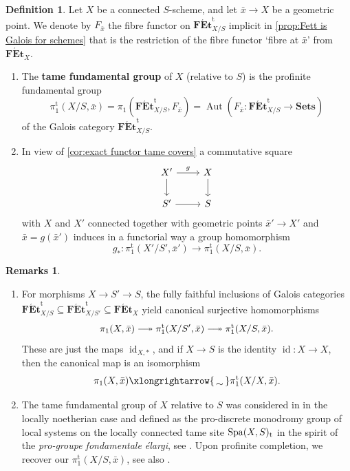 \documentclass[a4paper,twoside,11pt,reqno]{amsart}
\DeclareRobustCommand\longtwoheadrightarrow {\relbar\joinrel\twoheadrightarrow}
\newcommand{\surj}{\longtwoheadrightarrow}
\newcommand{\isomto}{\xlongrightarrow{\,\smash{\raisebox{-0.65ex} 
    {\ensuremath{\displaystyle\sim}}}\,}}
\newcommand{\la}{\longrightarrow}
\DeclareMathOperator{\id}{id}
\DeclareMathOperator{\Aut}{Aut}
\DeclareMathOperator{\Spa}{Spa}
\newcommand{\rt}{{\rm t}}  %
\newcommand{\cat}[1]{\mathbf{#1}}
\newcommand{\FEt}{\cat{F\acute{E}t}}
\newcommand{\Sets}{\cat{Sets}}
\newcommand{\pitame}{\pi_1^{\mathrm{t}}}
\newcommand{\FEtt}{{\cat{F\acute{E}t}}^{\!\mathrm{t}}}
\theoremstyle{definition}
\newtheorem{defi}[thm]{Definition}
\newtheorem{rmks}[thm]{Remarks}
\numberwithin{equation}{subsection}
\begin{document}
\begin{defi}
\label{defi:tamepi1 schemes}
    Let $X$ be a connected $S$-scheme, and let $\bar x \to X$ be a geometric point. We denote by $F_{\bar x}$ the fibre functor on $\FEtt_{X/S}$ implicit in \cref{prop:Fett is Galois for schemes} that is the restriction of the fibre functor `fibre at $\bar x$' from $\FEt_X$.     
    \begin{enumerate}
        \item 
        The \textbf{tame fundamental group} of $X$ (relative to $S$) is the profinite fundamental group  
        \[
        \pitame(X/S,\bar x) = \pi_1(\FEtt_{X/S}, F_{\bar x}) = \Aut(F_{\bar x} \colon \FEtt_{X/S} \to \Sets)
        \]
        of the Galois category $\FEtt_{X/S}$. 
        \item
        In view of \cref{cor:exact functor tame covers} a    commutative square
        \[ 
        \begin{tikzcd}
            X'\ar[d] \ar[r,"g"] & X\ar[d] \\
            S'\ar[r] & S
        \end{tikzcd}
        \]
        with $X$ and $X'$ connected together with geometric points $\bar x' \to X'$ and $\bar x = g(\bar x')$ induces in a functorial way a group homomorphism
        \[
        g_\ast \colon \pitame(X'/S',\bar x')  \la \pitame(X/S,\bar x).
        \]
\end{enumerate}
\end{defi}

\begin{rmks}
    \begin{enumerate}
        \item 
        For morphisms $X \to S' \to S$, the fully faithful inclusions of Galois categories $\FEtt_{X/S}  \subseteq \FEtt_{X/S'}  \subseteq\FEt_X$ yield canonical surjective homomorphisms
        \[
        \pi_1(X,\bar x) \surj \pitame(X/S',\bar x) \surj \pitame(X/S,\bar x).
        \]
        These are just the maps $\id_{X,\ast}$, and if $X \to S$ is the 
        identity $\id\colon X \to X$, then the canonical map is an isomorphism
        \[
        \pi_1(X,\bar x) \isomto \pitame(X/X,\bar x).
        \]
     
        \item 
        The tame fundamental group of $X$ relative to $S$ was considered in \cite[\S5]{HubnerSchmidt2021:TameSiteSchemea} in the locally noetherian case and defined as the pro-discrete monodromy group of local systems on the locally connected tame site $\Spa(X,S)_{\rt}$ in the spirit of the \emph{pro-groupe fondamentale \'elargi}, see \cite[X~\S6]{SGA3:2}.  Upon profinite completion, we recover our $\pitame(X/S,\bar x)$, see  also \cite[\S9]{Hubner2021:AdicTameSite}.      
    \end{enumerate}
\end{rmks}
\end{document}

